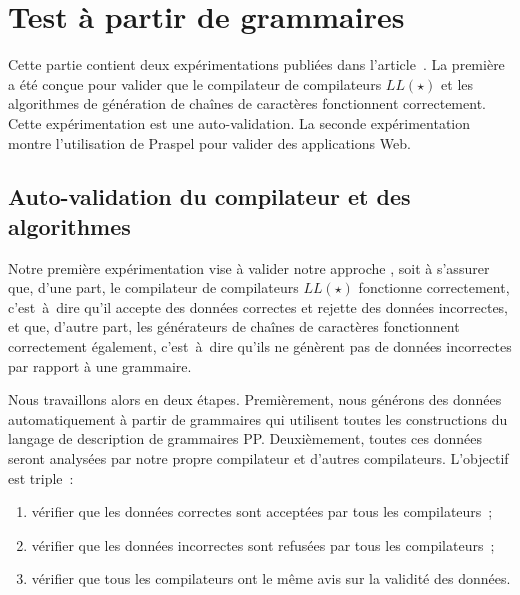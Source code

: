 \section{Test à partir de grammaires}
\label{section:experimentation:grammar}

Cette partie contient deux expérimentations publiées dans
l'article~. La première a été conçue pour valider que le
compilateur de compilateurs $LL(\star)$ et les algorithmes de génération de
chaînes de caractères fonctionnent correctement. Cette expérimentation est une
auto-validation. La seconde expérimentation montre l'utilisation de Praspel pour
valider des applications Web.

\subsection{Auto-validation du compilateur et des algorithmes}

Notre première expérimentation vise à valider notre approche
, soit à s'assurer que, d'une part, le
compilateur de compilateurs $LL(\star)$ fonctionne correctement, c'est~à~dire
qu'il accepte des données correctes et rejette des données incorrectes, et que,
d'autre part, les générateurs de chaînes de caractères fonctionnent correctement
également, c'est~à~dire qu'ils ne génèrent pas de données incorrectes par
rapport à une grammaire.

Nous travaillons alors en deux étapes. Premièrement, nous générons des données
automatiquement à partir de grammaires qui utilisent toutes les constructions du
langage de description de grammaires PP. Deuxièmement, toutes ces données seront
analysées par notre propre compilateur et d'autres compilateurs. L'objectif est
triple~:
%
\begin{enumerate}

\item vérifier que les données correctes sont acceptées par tous les
compilateurs~;

\item vérifier que les données incorrectes sont refusées par tous les
compilateurs~;

\item vérifier que tous les compilateurs ont le même avis sur la validité des
données.

\end{enumerate}


